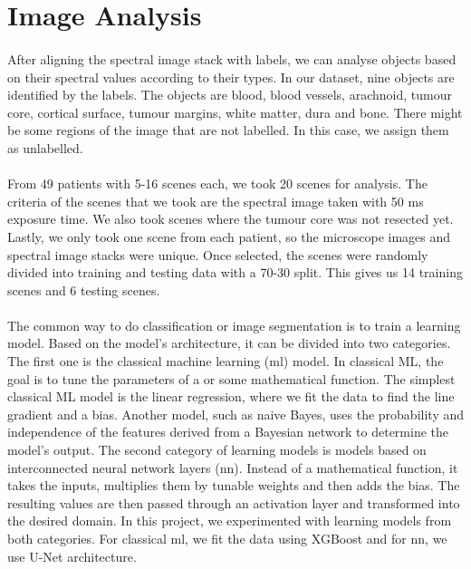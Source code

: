 \documentclass[12pt,oneside]{report}
\begin{document}
\section{Image Analysis}
\paragraph{}
After aligning the spectral image stack with labels, we can analyse objects based on their spectral values according to their types. In our dataset, nine objects are identified by the labels. The objects are blood, blood vessels, arachnoid, tumour core, cortical surface, tumour margins, white matter, dura and bone. There might be some regions of the image that are not labelled. In this case, we assign them as unlabelled.

\paragraph{}
From 49 patients with 5-16 scenes each, we took 20 scenes for analysis. The criteria of the scenes that we took are the spectral image taken with 50 ms exposure time. We also took scenes where the tumour core was not resected yet. Lastly, we only took one scene from each patient, so the microscope images and spectral image stacks were unique. Once selected, the scenes were randomly divided into training and testing data with a 70-30 split. This gives us 14 training scenes and 6 testing scenes.

\paragraph{}
The common way to do classification or image segmentation is to train a learning model. Based on the model's architecture, it can be divided into two categories. The first one is the classical machine learning (\acrshort{ml}) model. In classical ML, the goal is to tune the parameters of a or some mathematical function. The simplest classical ML model is the linear regression, where we fit the data to find the line gradient and a bias. Another model, such as naive Bayes, uses the probability and independence of the features derived from a Bayesian network to determine the model's output. The second category of learning models is models based on interconnected neural network layers (\acrshort{nn}). Instead of a mathematical function, it takes the inputs, multiplies them by tunable weights and then adds the bias. The resulting values are then passed through an activation layer and transformed into the desired domain. In this project, we experimented with learning models from both categories. For classical \acrshort{ml}, we fit the data using XGBoost \cite{chen_xgboost_2016} and for \acrshort{nn}, we use U-Net \cite{ronneberger_u-net_2015} architecture.
\end{document}
